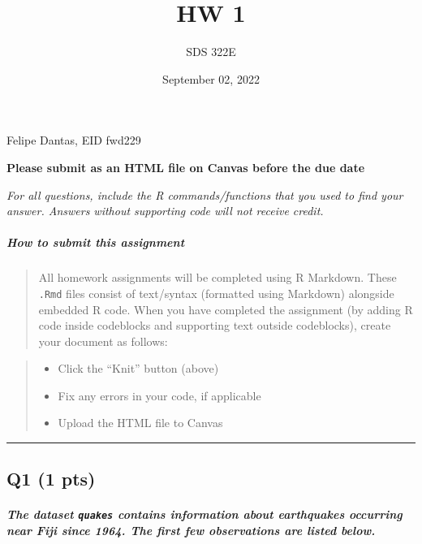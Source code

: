 \documentclass[
]{article}
\title{HW 1}
\author{SDS 322E}
\date{September 02, 2022}
\providecommand{\tightlist}{%
  \setlength{\itemsep}{0pt}\setlength{\parskip}{0pt}}
\begin{document}
\maketitle

{
\setcounter{tocdepth}{2}
\tableofcontents
}
Felipe Dantas, EID fwd229

\textbf{Please submit as an HTML file on Canvas before the due date}

\emph{For all questions, include the R commands/functions that you used
to find your answer. Answers without supporting code will not receive
credit.}

\hypertarget{how-to-submit-this-assignment}{%
\subparagraph{How to submit this
assignment}\label{how-to-submit-this-assignment}}

\begin{quote}
All homework assignments will be completed using R Markdown. These
\texttt{.Rmd} files consist of text/syntax (formatted using Markdown)
alongside embedded R code. When you have completed the assignment (by
adding R code inside codeblocks and supporting text outside codeblocks),
create your document as follows:
\end{quote}

\begin{quote}
\begin{itemize}
\tightlist
\item
  Click the ``Knit'' button (above)
\item
  Fix any errors in your code, if applicable
\item
  Upload the HTML file to Canvas
\end{itemize}
\end{quote}

\begin{center}\rule{0.5\linewidth}{0.5pt}\end{center}

\hypertarget{q1-1-pts}{%
\subsection{Q1 (1 pts)}\label{q1-1-pts}}

\hypertarget{the-dataset-quakes-contains-information-about-earthquakes-occurring-near-fiji-since-1964.-the-first-few-observations-are-listed-below.}{%
\subparagraph{\texorpdfstring{The dataset \texttt{quakes} contains
information about earthquakes occurring near Fiji since 1964. The first
few observations are listed
below.}{The dataset quakes contains information about earthquakes occurring near Fiji since 1964. The first few observations are listed below.}}\label{the-dataset-quakes-contains-information-about-earthquakes-occurring-near-fiji-since-1964.-the-first-few-observations-are-listed-below.}}
\end{document}
